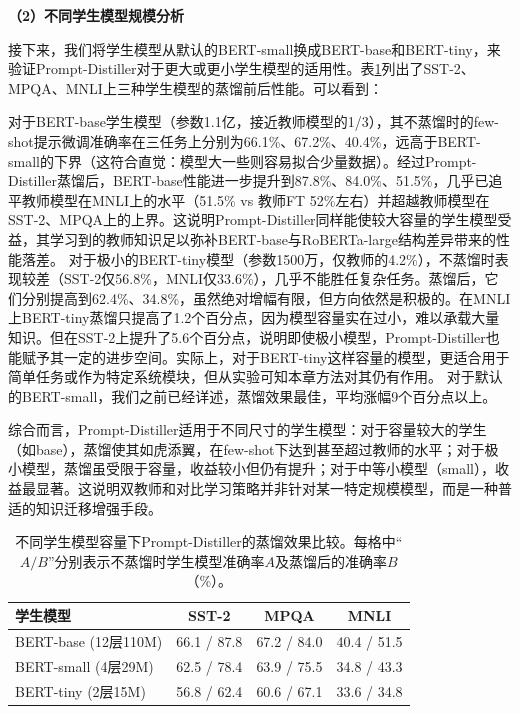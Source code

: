 \documentclass[../main.tex]{subfiles}
\begin{document}
\vspace{1em}
\textbf{（2）不同学生模型规模分析}
\vspace{0.5em}

接下来，我们将学生模型从默认的BERT-small换成BERT-base和BERT-tiny，来验证Prompt-Distiller对于更大或更小学生模型的适用性。表\ref{tab:model-scale}列出了SST-2、MPQA、MNLI上三种学生模型的蒸馏前后性能。可以看到：

对于BERT-base学生模型（参数1.1亿，接近教师模型的1/3），其不蒸馏时的few-shot提示微调准确率在三任务上分别为66.1\%、67.2\%、40.4\%，远高于BERT-small的下界（这符合直觉：模型大一些则容易拟合少量数据）。经过Prompt-Distiller蒸馏后，BERT-base性能进一步提升到87.8\%、84.0\%、51.5\%，几乎已追平教师模型在MNLI上的水平（51.5\% vs 教师FT 52\%左右）并超越教师模型在SST-2、MPQA上的上界。这说明Prompt-Distiller同样能使较大容量的学生模型受益，其学习到的教师知识足以弥补BERT-base与RoBERTa-large结构差异带来的性能落差。
对于极小的BERT-tiny模型（参数1500万，仅教师的4.2\%），不蒸馏时表现较差（SST-2仅56.8\%，MNLI仅33.6\%），几乎不能胜任复杂任务。蒸馏后，它们分别提高到62.4\%、34.8\%，虽然绝对增幅有限，但方向依然是积极的。在MNLI上BERT-tiny蒸馏只提高了1.2个百分点，因为模型容量实在过小，难以承载大量知识。但在SST-2上提升了5.6个百分点，说明即使极小模型，Prompt-Distiller也能赋予其一定的进步空间。实际上，对于BERT-tiny这样容量的模型，更适合用于简单任务或作为特定系统模块，但从实验可知本章方法对其仍有作用。
对于默认的BERT-small，我们之前已经详述，蒸馏效果最佳，平均涨幅9个百分点以上。

综合而言，Prompt-Distiller适用于不同尺寸的学生模型：对于容量较大的学生（如base），蒸馏使其如虎添翼，在few-shot下达到甚至超过教师的水平；对于极小模型，蒸馏虽受限于容量，收益较小但仍有提升；对于中等小模型（small），收益最显著。这说明双教师和对比学习策略并非针对某一特定规模模型，而是一种普适的知识迁移增强手段。

\begin{table}[htbp]
	\centering
	\caption{不同学生模型容量下Prompt-Distiller的蒸馏效果比较。每格中“$A/B$”分别表示不蒸馏时学生模型准确率$A$及蒸馏后的准确率$B$（\%）。}
	\label{tab:model-scale}
	\small\begin{tabular}{l|ccc}
		\toprule[1pt]
		\textbf{学生模型}       & \textbf{SST-2} & \textbf{MPQA} & \textbf{MNLI} \\
		\midrule[0.5pt]
		BERT-base (12层110M) & 66.1 / 87.8    & 67.2 / 84.0   & 40.4 / 51.5   \\
		BERT-small (4层29M)  & 62.5 / 78.4    & 63.9 / 75.5   & 34.8 / 43.3   \\
		BERT-tiny (2层15M)   & 56.8 / 62.4    & 60.6 / 67.1   & 33.6 / 34.8   \\
		\bottomrule[1pt]
	\end{tabular}
\end{table}
\end{document}
